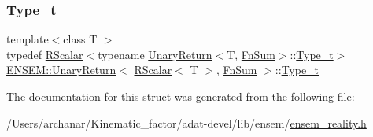 \mbox{\label{structENSEM_1_1UnaryReturn_3_01RScalar_3_01T_01_4_00_01FnSum_01_4_aca06bc5e18b4787990a7e7bd5e72d38c}} 
\subsubsection{\texorpdfstring{Type\_t}{Type\_t}\hspace{0.1cm}{\footnotesize\ttfamily [3/3]}}
{\footnotesize\ttfamily template$<$class T $>$ \\
typedef \mbox{\hyperlink{classENSEM_1_1RScalar}{R\+Scalar}}$<$typename \mbox{\hyperlink{structENSEM_1_1UnaryReturn}{Unary\+Return}}$<$T, \mbox{\hyperlink{structENSEM_1_1FnSum}{Fn\+Sum}}$>$\+::\mbox{\hyperlink{structENSEM_1_1UnaryReturn_3_01RScalar_3_01T_01_4_00_01FnSum_01_4_aca06bc5e18b4787990a7e7bd5e72d38c}{Type\+\_\+t}}$>$ \mbox{\hyperlink{structENSEM_1_1UnaryReturn}{E\+N\+S\+E\+M\+::\+Unary\+Return}}$<$ \mbox{\hyperlink{classENSEM_1_1RScalar}{R\+Scalar}}$<$ T $>$, \mbox{\hyperlink{structENSEM_1_1FnSum}{Fn\+Sum}} $>$\+::\mbox{\hyperlink{structENSEM_1_1UnaryReturn_3_01RScalar_3_01T_01_4_00_01FnSum_01_4_aca06bc5e18b4787990a7e7bd5e72d38c}{Type\+\_\+t}}}



The documentation for this struct was generated from the following file\+:\begin{DoxyCompactItemize}
\item 
/\+Users/archanar/\+Kinematic\+\_\+factor/adat-\/devel/lib/ensem/\mbox{\hyperlink{adat-devel_2lib_2ensem_2ensem__reality_8h}{ensem\+\_\+reality.\+h}}\end{DoxyCompactItemize}
